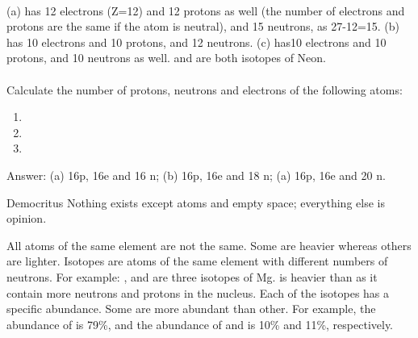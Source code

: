 \documentclass[main.tex]{subfiles}
\begin{document}
\begin{description}
\begin{example}
\begin{multicols}{4}
\begin{enumerate}[label=(\alph*)]
\end{enumerate}
\end{multicols}
\\
(a)    has 12 electrons (Z=12) and 12 protons as well (the number of electrons and protons are the same if the atom is neutral), and 15 neutrons, as 27-12=15. (b)   has 10 electrons and 10 protons, and 12 neutrons. (c)   has10 electrons and 10 protons, and 10 neutrons as well.   and  are both isotopes of Neon.
\\
\faDiamond\ \\
Calculate the number of protons, neutrons and electrons of the following atoms:
\begin{multicols}{3}
\begin{enumerate}[label=(\alph*)]
\item {} 
\item {} 
\item {} 
\end{enumerate}\end{multicols}
\flushright Answer: (a) 16p, 16e and 16 n; (b) 16p, 16e and 18 n; (a) 16p, 16e and 20 n. 
\end{example}%


\begin{marginfigure}
    \begin{shadequote}[l]{Democritus}
Nothing exists except atoms and empty space; everything else is opinion.
\end{shadequote}   \end{marginfigure}

\item[\docfilehook{Isotopes }{}] 
All atoms of the same element are not the same. Some are heavier whereas others are lighter. Isotopes are atoms of the same element with different numbers of neutrons. For example:  ,   and   are three isotopes of Mg.    is heavier than   as it contain more neutrons and protons in the nucleus. Each of the isotopes has a specific abundance. Some are more abundant than other. For example, the abundance of  is 79\%, and the abundance of   and   is 10\% and 11\%, respectively. 


\end{description}
\end{document}
